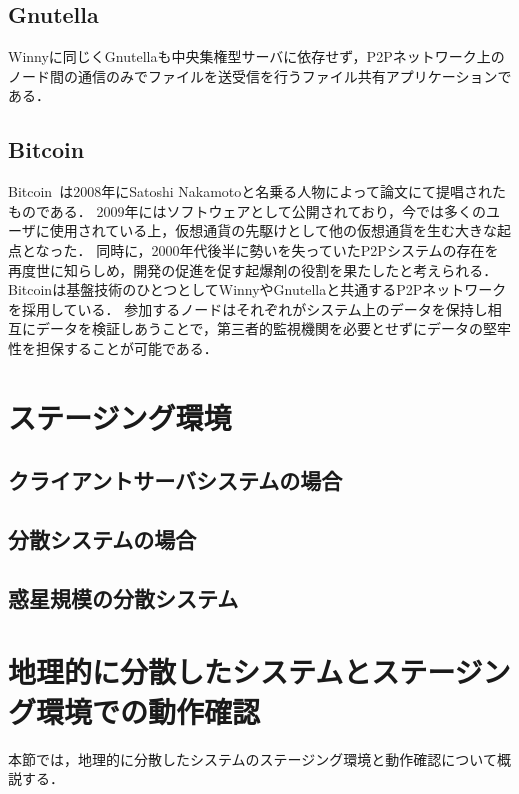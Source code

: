 \subsection{Gnutella}

Winnyに同じくGnutellaも中央集権型サーバに依存せず，P2Pネットワーク上のノード間の通信のみでファイルを送受信を行うファイル共有アプリケーションである．

\subsection{Bitcoin}

Bitcoin~\cite{Bitcoin}は2008年にSatoshi Nakamotoと名乗る人物によって論文にて提唱されたものである．
2009年にはソフトウェアとして公開されており，今では多くのユーザに使用されている上，仮想通貨の先駆けとして他の仮想通貨を生む大きな起点となった．
同時に，2000年代後半に勢いを失っていたP2Pシステムの存在を再度世に知らしめ，開発の促進を促す起爆剤の役割を果たしたと考えられる．
Bitcoinは基盤技術のひとつとしてWinnyやGnutellaと共通するP2Pネットワークを採用している．
参加するノードはそれぞれがシステム上のデータを保持し相互にデータを検証しあうことで，第三者的監視機関を必要とせずにデータの堅牢性を担保することが可能である．

\section{ステージング環境}

\subsection{クライアントサーバシステムの場合}

\subsection{分散システムの場合}

\subsection{惑星規模の分散システム}

\section{地理的に分散したシステムとステージング環境での動作確認}
\label{background:staging-environment}
本節では，地理的に分散したシステムのステージング環境と動作確認について概説する．

